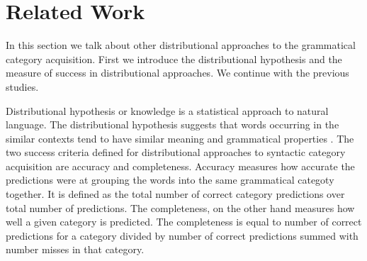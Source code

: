 \section{Related Work}


In this section we talk about other distributional approaches to the grammatical category
acquisition. First we introduce the distributional hypothesis and the measure
of success in distributional approaches. We continue with the previous
studies.

Distributional hypothesis or knowledge is a statistical approach to natural
language. The distributional hypothesis suggests that words 
occurring in the similar contexts tend to have similar meaning 
and grammatical properties \cite{harris1954word}. The two success criteria defined for
distributional approaches to syntactic category
acquisition are accuracy and completeness. Accuracy measures how
accurate the predictions were at grouping the words into the
same grammatical categoty together. It is defined
as the total number of correct category predictions
over total number of predictions. The completeness, on the other hand
measures how well a given category is predicted. The completeness
is equal to number of correct predictions for a category divided
by number of correct predictions summed with number misses in that category.


